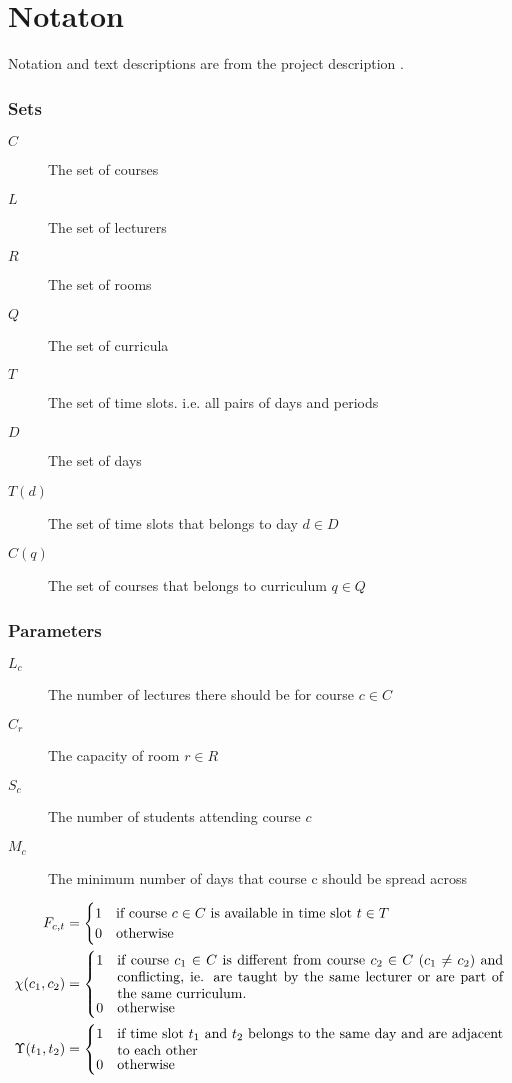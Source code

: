 \section{Notaton}
\label{appendix:notation}

Notation and text descriptions are from the project description \cite{assignment}.

\subsubsection*{Sets}

\begin{description}
\item[$C$] The set of courses
\item[$L$] The set of lecturers
\item[$R$] The set of rooms
\item[$Q$] The set of curricula
\item[$T$] The set of time slots. i.e. all pairs of days and periods
\item[$D$] The set of days
\item[$T(d)$] The set of time slots that belongs to day $d \in D$
\item[$C(q)$] The set of courses that belongs to curriculum $q \in Q$
\end{description}

\subsubsection*{Parameters}

\begin{description}
\item[$L_c$] The number of lectures there should be for course $c \in C$
\item[$C_r$] The capacity of room $r \in R$
\item[$S_c$] The number of students attending course $c$
\item[$M_c$] The minimum number of days that course c should be spread across
\end{description}

\begin{align*}
F_{c,t} &= \begin{cases}
1 & \text{if course $c \in C$ is available in time slot $t \in T$} \\
0 & \text{otherwise}
\end{cases} \\
\chi(c_1, c_2) &= \begin{cases}
1 & \parbox[t]{.8\textwidth}{if course $c_1 \in C$ is different from course $c_2 \in C$ ($c_1 \not = c_2$) and conflicting, ie. are taught by the same lecturer or are part of the same curriculum.} \\
0 & \text{otherwise}
\end{cases} \\
\Upsilon(t_1, t_2) &= \begin{cases}
1 & \parbox[t]{.8\textwidth}{if time slot $t_1$ and $t_2$ belongs to the same day and are adjacent to each other} \\
0 & \text{otherwise}
\end{cases}
\end{align*}

